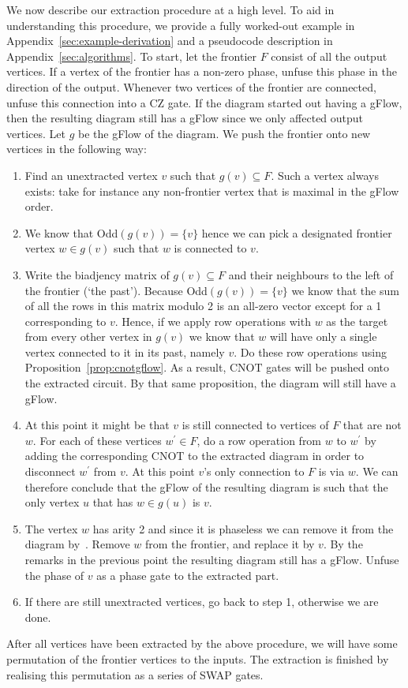 \documentclass[a4paper,onecolumn,superscriptaddress,11pt,accepted=2020-04-27]{quantumarticle}
\newcommand{\CX}{\ensuremath{\textrm{CNOT}}\xspace}
\newcommand{\CNOT}{\CX}
\theoremstyle{definition}
\begin{document}
We now describe our extraction procedure at a high level. To aid in understanding this procedure, we provide a fully worked-out example in Appendix~\ref{sec:example-derivation} and a pseudocode description in Appendix~\ref{sec:algorithms}. To start, let the frontier $F$ consist of all the output vertices. If a vertex of the frontier has a non-zero phase, unfuse this phase in the direction of the output. Whenever two vertices of the frontier are connected, unfuse this connection into a CZ gate. If the diagram started out having a gFlow, then the resulting diagram still has a gFlow since we only affected output vertices.
Let $g$ be the gFlow of the diagram. We push the frontier onto new vertices in the following way:
\begin{enumerate}
  \item Find an unextracted vertex $v$ such that $g(v)\subseteq F$. Such a vertex always exists: take for instance any non-frontier vertex that is maximal in the gFlow order.
  \item We know that Odd$(g(v)) = \{v\}$ hence we can pick a designated frontier vertex $w\in g(v)$ such that $w$ is connected to $v$.
  \item Write the biadjency matrix of $g(v)\subseteq F$ and their neighbours to the left of the frontier (`the past'). Because Odd$(g(v)) = \{v\}$ we know that the sum of all the rows in this matrix modulo 2 is an all-zero vector except for a 1 corresponding to $v$. Hence, if we apply row operations with $w$ as the target from every other vertex in $g(v)$ we know that $w$ will have only a single vertex connected to it in its past, namely $v$. Do these row operations using Proposition~\ref{prop:cnotgflow}. As a result, \CNOT gates will be pushed onto the extracted circuit. By that same proposition, the diagram will still have a gFlow.
  \item At this point it might be that $v$ is still connected to vertices of $F$ that are not $w$. For each of these vertices $w^\prime \in F$, do a row operation from $w$ to $w^\prime$ by adding the corresponding \CNOT to the extracted diagram in order to disconnect $w^\prime$ from $v$. At this point $v$'s only connection to $F$ is via $w$. We can therefore conclude that the gFlow of the resulting diagram is such that the only vertex $u$ that has $w\in g(u)$ is $v$.
  \item The vertex $w$ has arity 2 and since it is phaseless we can remove it from the diagram by~\IdentityRule. Remove $w$ from the frontier, and replace it by $v$. By the remarks in the previous point the resulting diagram still has a gFlow. Unfuse the phase of $v$ as a phase gate to the extracted part.
  \item If there are still unextracted vertices, go back to step 1, otherwise we are done.
\end{enumerate}
After all vertices have been extracted by the above procedure, we will have some permutation of the frontier vertices to the inputs. The extraction is finished by realising this permutation as a series of SWAP gates.
\end{document}
